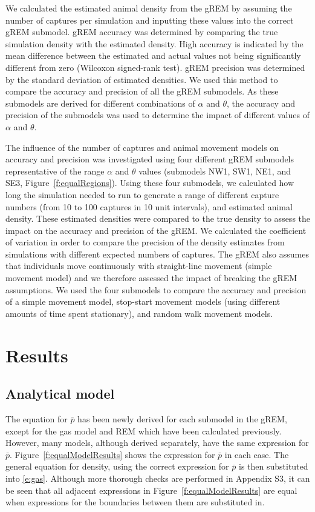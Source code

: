 \documentclass[a4paper,10pt,reqno,oneside]{amsart}
\begin{document}
We calculated the estimated animal density from the gREM by assuming the number of captures per simulation and inputting these values into the correct gREM submodel. gREM accuracy was determined by comparing the true simulation density with the estimated density. High accuracy is indicated by the mean difference between the estimated and actual values not being significantly different from zero (Wilcoxon signed-rank test). gREM precision was determined by the standard deviation of estimated densities. We used this method to compare the accuracy and precision of all the gREM submodels. As these submodels are derived for different combinations of $\alpha$ and $\theta$, the accuracy and precision of the submodels was used to determine the impact of different values of $\alpha$ and $\theta$. 

The influence of the number of captures and animal movement models on accuracy and precision was investigated using four different gREM submodels representative of the range $\alpha$ and $\theta$ values (submodels NW1, SW1, NE1, and SE3, Figure~\ref{f:equalRegions}). Using these four submodels, we calculated how long the simulation needed to run to generate a range of different capture numbers (from 10 to 100 captures in 10 unit intervals), and estimated animal density. These estimated densities were compared to the true density to assess the impact on the accuracy and precision of the gREM. We calculated the coefficient of variation in order to compare the precision of the density estimates from simulations with different expected numbers of captures. The gREM also assumes that individuals move continuously with straight-line movement (simple movement model) and we therefore assessed the impact of breaking the gREM assumptions. We used the four submodels to compare the accuracy and precision of a simple movement model, stop-start movement models (using different amounts of time spent stationary), and random walk movement models.

\section*{Results}

\subsection*{Analytical model}

The equation for $\bar{p}$ has been newly derived for each submodel in the gREM, except for the gas model and REM which have been calculated previously. However, many models, although derived separately, have the same expression for $\bar{p}$. Figure~\ref{f:equalModelResults} shows the expression for $\bar{p}$ in each case. The general equation for density, using the correct expression for $\bar{p}$ is then substituted into \ref{e:gas}. Although more thorough checks are performed in Appendix S3, it can be seen that all adjacent expressions in Figure~\ref{f:equalModelResults} are equal when expressions for the boundaries between them are substituted in.
\end{document}
